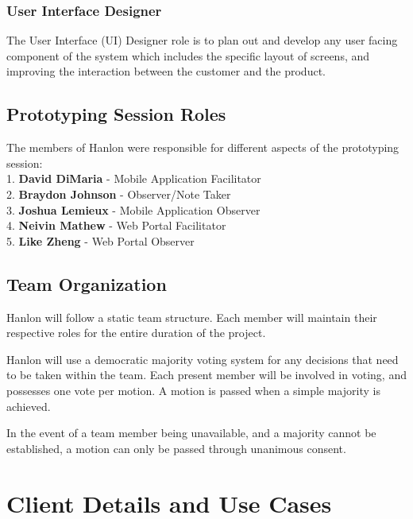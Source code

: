 \documentclass[12pt,letterpaper]{article}
\begin{document}
\subsubsection*{User Interface Designer}
The User Interface (UI) Designer role is to plan out and develop any user facing component of the system which includes the specific layout of screens, and improving the interaction between the customer and the product.

\subsection{Prototyping Session Roles}
The members of Hanlon were responsible for different aspects of the prototyping session:\\
1. \textbf{\hspace*{8pt}David DiMaria} - Mobile Application Facilitator\\
2. \textbf{\hspace*{8pt}Braydon Johnson} - Observer/Note Taker\\
3. \textbf{\hspace*{8pt}Joshua Lemieux} - Mobile Application Observer\\
4. \textbf{\hspace*{8pt}Neivin Mathew} - Web Portal Facilitator\\
5. \textbf{\hspace*{8pt}Like Zheng} - Web Portal Observer

\subsection{Team Organization}
Hanlon will follow a static team structure. Each member will maintain their respective roles for the entire duration of the project. \par

Hanlon will use a democratic majority voting system for any decisions that need to be taken within the team. Each present member will be involved in voting, and possesses one vote per motion. A motion is passed when a simple majority is achieved. \par

In the event of a team member being unavailable, and a majority cannot be established, a motion can only be passed through unanimous consent.

\clearpage
\section{Client Details and Use Cases}
\end{document}
